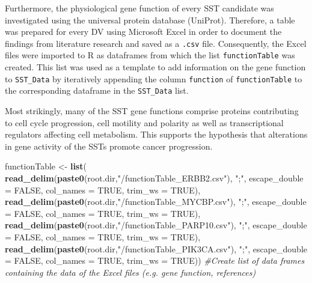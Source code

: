 \documentclass[]{article}
\newenvironment{Shaded}{\begin{snugshade}}{\end{snugshade}}
\newcommand{\CommentTok}[1]{\textcolor[rgb]{0.56,0.35,0.01}{\textit{#1}}}
\newcommand{\DataTypeTok}[1]{\textcolor[rgb]{0.13,0.29,0.53}{#1}}
\newcommand{\KeywordTok}[1]{\textcolor[rgb]{0.13,0.29,0.53}{\textbf{#1}}}
\newcommand{\NormalTok}[1]{#1}
\newcommand{\OtherTok}[1]{\textcolor[rgb]{0.56,0.35,0.01}{#1}}
\newcommand{\StringTok}[1]{\textcolor[rgb]{0.31,0.60,0.02}{#1}}
\begin{document}
Furthermore, the physiological gene function of every SST candidate was
investigated using the universal protein database (UniProt). Therefore,
a table was prepared for every DV using Microsoft Excel in order to
document the findings from literature research and saved as a
\texttt{.csv} file. Consequently, the Excel files were imported to R as
dataframes from which the list \texttt{functionTable} was created. This
list was used as a template to add information on the gene function to
\texttt{SST\_Data} by iteratively appending the column \texttt{function}
of \texttt{functionTable} to the corresponding dataframe in the
\texttt{SST\_Data} list.

Most strikingly, many of the SST gene functions comprise proteins
contributing to cell cycle progression, cell motility and polarity as
well as transcriptional regulators affecting cell metabolism. This
supports the hypothesis that alterations in gene activity of the SSTs
promote cancer progression.

\begin{Shaded}
\begin{Highlighting}[]
\NormalTok{functionTable <-}\StringTok{ }\KeywordTok{list}\NormalTok{(}
\KeywordTok{read_delim}\NormalTok{(}\KeywordTok{paste0}\NormalTok{(root.dir,}\StringTok{"/functionTable_ERBB2.csv"}\NormalTok{), }\StringTok{";"}\NormalTok{, }\DataTypeTok{escape_double =} \OtherTok{FALSE}\NormalTok{, }\DataTypeTok{col_names =} \OtherTok{TRUE}\NormalTok{, }\DataTypeTok{trim_ws =} \OtherTok{TRUE}\NormalTok{),  }\KeywordTok{read_delim}\NormalTok{(}\KeywordTok{paste0}\NormalTok{(root.dir,}\StringTok{"/functionTable_MYCBP.csv"}\NormalTok{), }\StringTok{";"}\NormalTok{, }\DataTypeTok{escape_double =} \OtherTok{FALSE}\NormalTok{, }\DataTypeTok{col_names =} \OtherTok{TRUE}\NormalTok{, }\DataTypeTok{trim_ws =} \OtherTok{TRUE}\NormalTok{), }\KeywordTok{read_delim}\NormalTok{(}\KeywordTok{paste0}\NormalTok{(root.dir,}\StringTok{"/functionTable_PARP10.csv"}\NormalTok{), }\StringTok{";"}\NormalTok{, }\DataTypeTok{escape_double =} \OtherTok{FALSE}\NormalTok{, }\DataTypeTok{col_names =} \OtherTok{TRUE}\NormalTok{, }\DataTypeTok{trim_ws =} \OtherTok{TRUE}\NormalTok{), }\KeywordTok{read_delim}\NormalTok{(}\KeywordTok{paste0}\NormalTok{(root.dir,}\StringTok{"/functionTable_PIK3CA.csv"}\NormalTok{), }\StringTok{";"}\NormalTok{, }\DataTypeTok{escape_double =} \OtherTok{FALSE}\NormalTok{, }\DataTypeTok{col_names =} \OtherTok{TRUE}\NormalTok{, }\DataTypeTok{trim_ws =} \OtherTok{TRUE}\NormalTok{)) }\CommentTok{#Create list of data frames containing the data of the Excel files (e.g. gene function, references)}
\end{Highlighting}
\end{Shaded}
\end{document}
